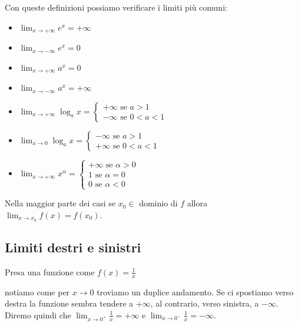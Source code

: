 Con queste definizioni possiamo verificare i limiti più comuni:
\begin{itemize}
    \item $\lim_{x\to+\infty}e^x=+\infty$
    \item $\lim_{x\to-\infty}e^x=0$
    \item $\lim_{x\to+\infty}a^x=0$
    \item $\lim_{x\to-\infty}a^x=+\infty$
    \item $\lim_{x\to+\infty}\log_ax=\begin{cases}+\infty \text{ se } a>1\\-\infty \text{ se } 0<a<1\end{cases}$
    \item $\lim_{x\to0}\log_ax=\begin{cases}-\infty \text{ se } a>1\\+\infty \text{ se } 0<a<1\end{cases}$
    \item $\lim_{x\to+\infty}x^\alpha=\begin{cases}+\infty \text{ se } \alpha>0\\1 \text{ se } \alpha =0\\0 \text{ se } \alpha <0\end{cases}$
\end{itemize}

\begin{osservation}
    Nella maggior parte dei casi se $x_0\in$ dominio di $f$ allora $\lim_{x\to x_0}f(x)=f(x_0)$.
\end{osservation}

\subsection*{Limiti destri e sinistri}
Presa una funzione come $f(x)=\frac{1}{x}$


notiamo come per $x\rightarrow 0$ troviamo un duplice andamento. Se ci spostiamo verso destra la funzione sembra tendere a $+\infty$, al contrario, verso sinistra, a $-\infty$. Diremo quindi che $\lim_{x\to 0^+}\frac{1}{x}=+\infty$ e $\lim_{x\to 0^-}\frac{1}{x}=-\infty$.

